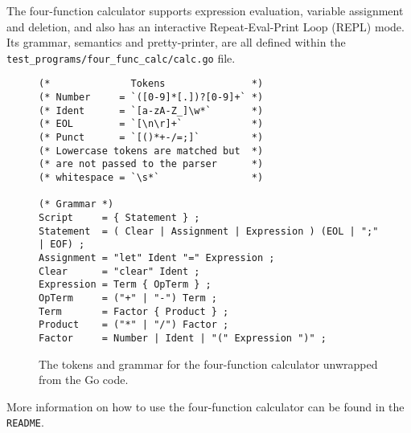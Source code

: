 The four-function calculator supports expression evaluation, variable assignment and deletion, and also has an interactive Repeat-Eval-Print Loop (REPL) mode. Its grammar, semantics and pretty-printer, are all defined within the \verb|test_programs/four_func_calc/calc.go| file.

\begin{figure}[H]
    \begin{verbatim}
(*              Tokens               *)
(* Number     = `([0-9]*[.])?[0-9]+` *)
(* Ident      = `[a-zA-Z_]\w*`       *)
(* EOL        = `[\n\r]+`            *)
(* Punct      = `[()*+-/=;]`         *)
(* Lowercase tokens are matched but  *)
(* are not passed to the parser      *)
(* whitespace = `\s*`                *)

(* Grammar *)
Script     = { Statement } ;
Statement  = ( Clear | Assignment | Expression ) (EOL | ";" | EOF) ;
Assignment = "let" Ident "=" Expression ;
Clear      = "clear" Ident ;
Expression = Term { OpTerm } ;
OpTerm     = ("+" | "-") Term ;
Term       = Factor { Product } ;
Product    = ("*" | "/") Factor ;
Factor     = Number | Ident | "(" Expression ")" ;
    \end{verbatim}
    \cprotect\caption{The tokens and grammar for the four-function calculator unwrapped from the Go code.}
\end{figure}

More information on how to use the four-function calculator can be found in the \verb|README|.

